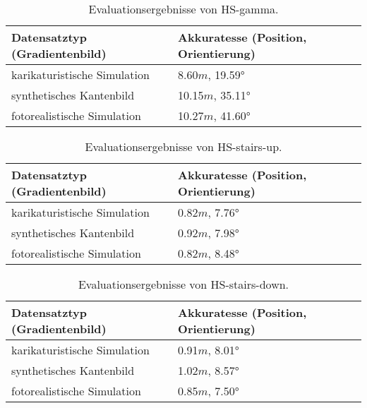 \begin{table}
	\centering
	\caption{Evaluationsergebnisse von HS-gamma.}
	\begin{tabularx}{0.75\textwidth}{X X}\textbf{Datensatztyp} \hspace{2cm} (Gradientenbild)& \textbf{Akkuratesse} \hspace{2cm} (Position, Orientierung)\\
		\hline
		karikaturistische Simulation & 8.60$m$, 19.59°\\
		\hline
		synthetisches Kantenbild & 10.15$m$, 35.11°\\
		\hline
		fotorealistische Simulation & 10.27$m$, 41.60°\\
	\end{tabularx}
	\label{tab:synth_hs_gamma}
\end{table}


\begin{table}
	\centering
	\caption{Evaluationsergebnisse von HS-stairs-up.}
	\begin{tabularx}{0.75\textwidth}{X X}\textbf{Datensatztyp} \hspace{2cm} (Gradientenbild)& \textbf{Akkuratesse} \hspace{2cm} (Position, Orientierung)\\
		\hline
		karikaturistische Simulation & 0.82$m$, 7.76°\\
		\hline
		synthetisches Kantenbild & 0.92$m$, 7.98°\\
		\hline
		fotorealistische Simulation & 0.82$m$, 8.48°\\
	\end{tabularx}
	\label{tab:synth_hs_stairs_up}
\end{table}



\begin{table}
	\centering
	\caption{Evaluationsergebnisse von HS-stairs-down.}
	\begin{tabularx}{0.75\textwidth}{X X}\textbf{Datensatztyp} \hspace{2cm} (Gradientenbild)& \textbf{Akkuratesse} \hspace{2cm} (Position, Orientierung)\\
		\hline
		karikaturistische Simulation & 0.91$m$, 8.01°\\
		\hline
		synthetisches Kantenbild & 1.02$m$, 8.57°\\
		\hline
		fotorealistische Simulation & 0.85$m$, 7.50°\\
	\end{tabularx}
	\label{tab:synth_hs_stairs_down}
\end{table}